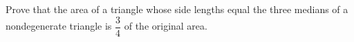 Prove that the area of a triangle whose side lengths equal the three medians of a nondegenerate triangle is $\dfrac{3}{4}$ of the original area.
